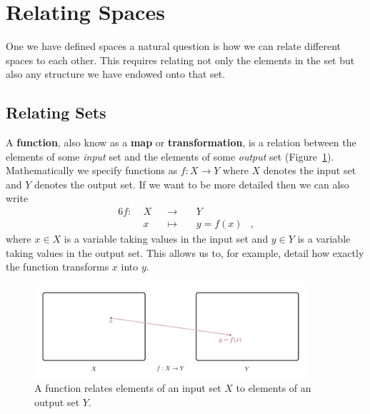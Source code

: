 \documentclass[
  letterpaper,
  DIV=11,
  numbers=noendperiod]{scrartcl}
\begin{document}
\hypertarget{relating-spaces}{%
\section{Relating Spaces}\label{relating-spaces}}

One we have defined spaces a natural question is how we can relate
different spaces to each other. This requires relating not only the
elements in the set but also any structure we have endowed onto that
set.

\hypertarget{relating-sets}{%
\subsection{Relating Sets}\label{relating-sets}}

A \textbf{function}, also know as a \textbf{map} or
\textbf{transformation}, is a relation between the elements of some
\emph{input} set and the elements of some \emph{output} set
(Figure~\ref{fig-function}). Mathematically we specify functions as
\(f : X \rightarrow Y\) where \(X\) denotes the input set and \(Y\)
denotes the output set. If we want to be more detailed then we can also
write \begin{alignat*}{6}
f :\; & X & &\rightarrow& \; & Y &
\\
& x & &\mapsto& & y = f(x) &,
\end{alignat*} where \(x \in X\) is a variable taking values in the
input set and \(y \in Y\) is a variable taking values in the output set.
This allows us to, for example, detail how exactly the function
transforms \(x\) into \(y\).

\begin{figure}

{\centering \includegraphics[width=0.9\textwidth,height=\textheight]{figures/maps/function/function.pdf}

}

\caption{\label{fig-function}A function relates elements of an input set
\(X\) to elements of an output set \(Y\).}

\end{figure}
\end{document}
